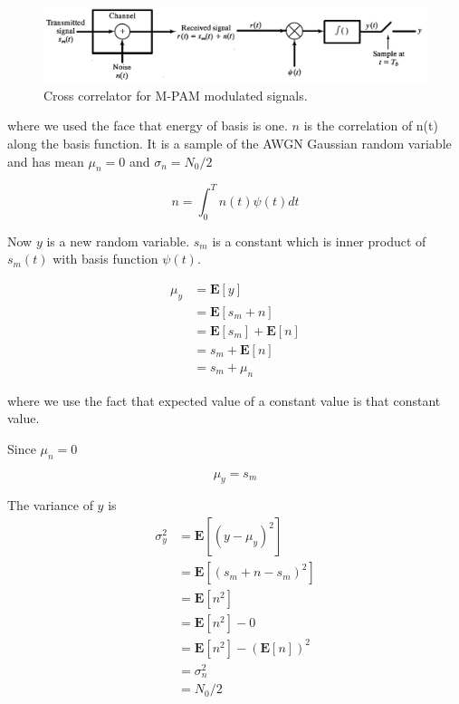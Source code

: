 \documentclass[a4paper]{article}
\numberwithin{equation}{subsection}
\begin{document}
		\begin{figure}
		\centering
		\includegraphics[width=\linewidth]{../figures/AWGNChannel}
		\caption{Cross correlator for M-PAM modulated signals.}
		\label{fig:fig820}
	\end{figure}

	where we used the face that energy of basis is one. $n$ is the correlation of n(t) along the basis function. It is a sample of the AWGN Gaussian random variable and has mean $\mu_n=0$ and $\sigma_n=N_0/2$ 
	
	
	\begin{equation}\label{key}
	n=\int_0^T n(t) \psi(t) dt
	\end{equation}
	
	Now $y$ is a new random variable. $s_m$ is a constant which is inner product of $s_m(t)$ with basis function $\psi(t)$.
	
	\begin{equation}\label{eq:muy}
	\begin{aligned}
	\mu_y
	&=\mathbf{E}[y] \\
	&=\mathbf{E}[s_m+n] \\
	&=\mathbf{E}[s_m]+\mathbf{E}[n] \\
	&=s_m+\mathbf{E}[n] \\
	&=s_m+\mu_n
	\end{aligned}
	\end{equation}
	
	where we use the fact that expected value of a constant value is that constant value.
	
	Since $\mu_n=0$
	
	\begin{equation}\label{key}
	\mu_y=s_m
	\end{equation}
	
	The variance of $y$ is
	\begin{equation}\label{eq:sigmay}
	\begin{aligned}
	\sigma^2_y
	&=\mathbf{E}[(y-\mu_y)^2] \\
	&=\mathbf{E}[(s_m+n-s_m)^2] \\
	&=\mathbf{E}[n^2] \\
	&=\mathbf{E}[n^2]-0 \\
	&=\mathbf{E}[n^2]-(\mathbf{E}[n])^2 \\
	&=\sigma_n^2 \\
	&=N_0/2
	\end{aligned}
	\end{equation}
	
\end{document}
